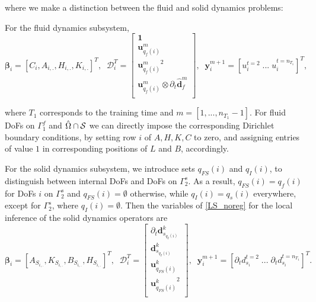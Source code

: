 \documentclass[%
  onecolumn
]{mpi2015-cscpreprint}
\begin{document}
\noindent where we make a distinction between the fluid and solid dynamics problems:

\noindent For the fluid dynamics subsystem,
\begin{equation}
\label{LSfl}
\boldsymbol{\beta}_i=[C_i,A_{i,.}, H_{i,.}, K_{i,.}]^T, \;\;
\mathcal{D}_i^T=
\begin{bmatrix}
  \mathbf{1}\\
  \mathbf{u}_{q_f(i)}^m \\
  {\mathbf{u}_{q_f(i)}^m}^2\\
  \mathbf{u}_{q_f(i)}^m \otimes \partial_t \hat{\mathbf{d}}_f^m\\
\end{bmatrix},
\;\;
\mathbf{y}_i^{m+1}=[u_i^{t=2} \; ... \; u_i^{t=n_{T_1}}]^T,
\end{equation}

\noindent where $T_1$ corresponds to the training time and $m=[1,...,n_{T_1}-1]$. For fluid DoFs on $\Gamma_1^f$ and $\hat{\Omega} \cap \cal{S}$
we can directly impose the corresponding Dirichlet boundary conditions, by setting row $i$ of $A,H,K,C$ to zero, and assigning entries of value $1$ in corresponding positions of $L$ and $B$, accordingly.

\noindent For the solid dynamics subsystem, we introduce sets $q_{FS}(i)$ and $q_{I}(i)$, to distinguish between internal DoFs and DoFs on $\Gamma_2^s$. As a result, $q_{FS}(i)=q_f(i)$ for DoFs $i$ on $\Gamma_2^s$ and $q_{FS}(i)=\emptyset$ otherwise, while $q_{I}(i)=q_s(i)$ everywhere, except for $\Gamma_2^s$, where $q_{I}(i)=\emptyset$. Then the variables of \cref{LS_noreg} for the local inference of the solid dynamics operators are
\begin{equation}
\label{LSsol}
\boldsymbol{\beta}_i=[A_{S_{i,.}},K_{S_{i,.}}, B_{S_{i,.}}, H_{S_{i,.}}]^T, \;\;
\mathcal{D}_i^T=
\begin{bmatrix}
  \partial_{t} \mathbf{d}_{s_{q_I(i)}}^k\\
  \mathbf{d}_{s_{q_I(i)}}^k\\
  \mathbf{u}_{q_{FS}(i)}^k\\
  {\mathbf{u}_{q_{FS}(i)}^k}^2\\
\end{bmatrix},
\;\;
\mathbf{y}_i^{m+1}=[\partial_{t} {d}_{s_i}^{t=2} \; ... \; \partial_{t} {d}_{s_i}^{t=n_{T_1}}]^T.
\end{equation}
\end{document}
